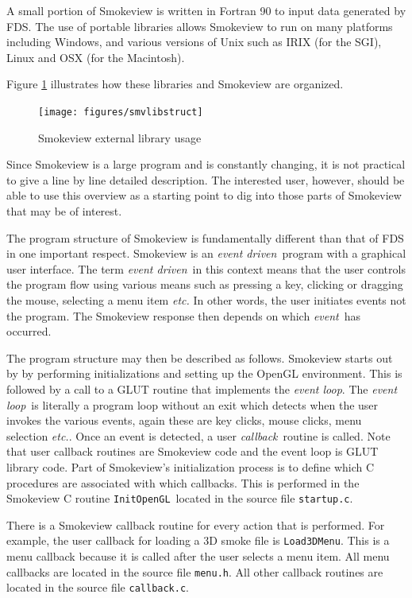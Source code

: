 \documentclass[11pt,twoside]{book}
\begin{document}
A small portion of Smokeview is written in Fortran 90 to input data
generated by FDS.  The use of portable libraries allows Smokeview
to run on many platforms including Windows, and various versions
of Unix such as IRIX (for the SGI), Linux and OSX (for the
Macintosh).

Figure \ref{smvlibstruct} illustrates how these libraries and Smokeview are organized.

\begin{figure}
\texttt{[image: figures/smvlibstruct]}
\caption{Smokeview external library usage}
\label{smvlibstruct}
\end{figure}


Since Smokeview is a large program and is constantly changing,
it is not practical to give a line by line detailed description.
The interested user, however, should be able to use this overview as a starting point to
dig into those parts of Smokeview that may be of interest.

The program structure of Smokeview is fundamentally different than that of FDS in one important respect.  Smokeview is an {\em event driven}\ program with a graphical user interface.  The term {\em event driven}\ in this context means that the user controls the program flow using various means such as pressing a key, clicking or dragging the mouse, selecting a menu item {\em etc.}  In other words, the user initiates events not the program.
The Smokeview response then depends on which {\em event}\ has occurred.

The program structure may then be described as follows.
Smokeview starts out by by performing initializations and setting up the OpenGL environment.
This is followed by a call to a GLUT routine that implements the {\em event loop}.
The {\em event loop}\ is literally a program loop without an exit
which detects when the user invokes the various events,
again these are key clicks, mouse clicks, menu selection {\em etc.}.
Once an event is detected, a user {\em callback}\ routine is called.  Note that user callback routines are Smokeview code and the event loop is GLUT library code. Part of Smokeview's initialization process is to define which C procedures are associated with which callbacks.  This is performed in the Smokeview C routine {\tt InitOpenGL}\ located in the source file {\tt startup.c}.

There is a Smokeview callback routine for every action that is performed.  For example, the user callback for loading a 3D smoke file is {\tt Load3DMenu}.  This is a menu callback because it is called after the user selects a menu item.  All menu callbacks are located in the source file {\tt menu.h}.  All other callback routines are located in the source file {\tt callback.c}.
\end{document}

